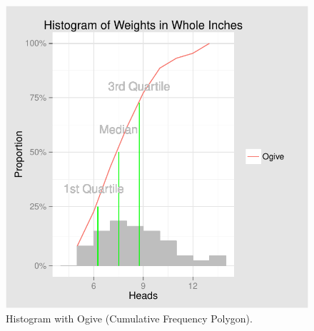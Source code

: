 \documentclass[nohyper,justified]{tufte-handout}\usepackage[]{graphicx}\usepackage[]{color}
\makeatletter
\def\maxwidth{ %
  \ifdim\Gin@nat@width>\linewidth
    \linewidth
  \else
    \Gin@nat@width
  \fi
}
\newenvironment{knitrout}{}{} %
\makeatother
\begin{document}
\begin{knitrout}
\color{fgcolor}\begin{figure}[h!]

{\centering \includegraphics[width=\maxwidth]{figure/graphics-ogive-1} 

}

\caption[Histogram with Ogive (Cumulative Frequency Polygon)]{Histogram with Ogive (Cumulative Frequency Polygon).}\label{fig:ogive}
\end{figure}


\end{knitrout}
\end{document}
